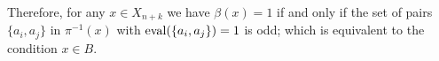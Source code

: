 

Therefore, for any $x \in X_{n+k}$ we have $\beta(x) = 1$ if and only if the set of pairs $\{a_i, a_j\}$ in $\pi^{-1}(x)$ with $\operatorname{eval}(\{a_i, a_j\}) = 1$ is odd; which is equivalent to the condition $x \in B$.